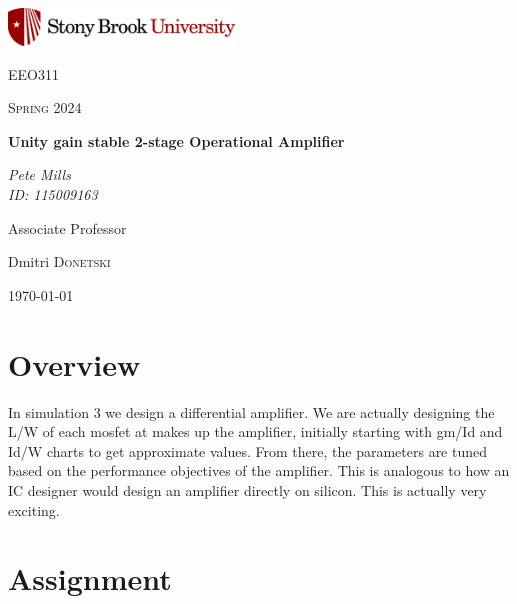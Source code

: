 \documentclass{article}
\begin{document}
	
\begin{titlepage}
	\centering
	\includegraphics[width=0.45\textwidth]{sbu}\par\vspace{1cm}
	{\LARGE \textsc{EEO311}\par}
	\vspace{1cm}
	{\Large \textsc{Spring 2024}\par}
	\vspace{1.5cm}
	{\huge\bfseries Unity gain stable 2-stage Operational Amplifier\par}
	\vspace{2cm}
	{\Large\itshape Pete Mills\\ID: 115009163\par}
	\vfill
	Associate Professor\par
	Dmitri \textsc{Donetski}

	\vfill

	{\large \today\par}
\end{titlepage}

	\newcommand{\assName}{EEO311Sim4}

	
	
	

	\section*{Overview}
	
	 In simulation 3 we design a differential amplifier. We are actually designing the L/W of each mosfet at makes up the amplifier, initially starting with gm/Id and Id/W charts to get approximate values. From there, the parameters are tuned based on the performance objectives of the amplifier. This is analogous to how an IC designer would design an amplifier directly on silicon. This is actually very exciting.
	
	\section{Assignment}
\end{document}
